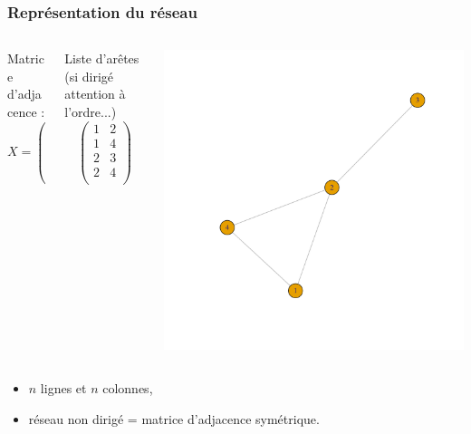 \documentclass[nopagenumber,9pt]{beamer}
\begin{document}
\begin{frame}
\frametitle{Représentation du réseau}

 \begin{columns}
 \begin{column}{.35\paperwidth}
Matrice d'adjacence : 
 $$X=\left(
\begin{array}{rrrrr}
0 & 1 & 0 & 0 \\ 
1 & 0 & 1 & 1 \\ 
0 & 0 & 0 & 0 \\ 
1 & 1 & 0 & 0 \\ 
\end{array}\right)
$$
\end{column}

\begin{column}{.2\paperwidth}
Liste d'ar\^etes (si dirigé attention à l'ordre...)
$$\left(
\begin{array}{rr}
1 & 2\\ 
1 & 4\\ 
2 & 3 \\ 
2 & 4\\ 
\end{array}\right)
$$ 
\end{column}


\begin{column}{.5\paperwidth}

\includegraphics[scale=.3]{plots/graphe_adj.pdf}

\end{column}

\end{columns}

\begin{itemize}
\item $n$ lignes et $n$ colonnes,
\item réseau non dirigé = matrice d'adjacence symétrique.
\end{itemize}

\end{frame}
\end{document}
